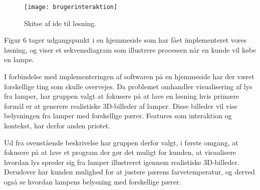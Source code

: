 \begin{figure}[H]
   \centering
   \texttt{[image: brugerinteraktion]}
   \caption{Skitse af ide til løsning.}
\end{figure}

Figur 6 tager udgangspunkt i en hjemmeside som har fået implementeret vores løsning, og viser et sekvensdiagram som illustrere processen når en kunde vil købe en lampe.  

I forbindelse med implementeringen af softwaren på en hjemmeside har der været forskellige ting som skulle overvejes. Da problemet omhandler visualisering af lys fra lamper, har gruppen valgt at fokusere på at lave en løsning hvis primære formål er at generere realistiske 3D-billeder af lamper. Disse billeder vil vise belysningen fra lamper med forskellige pærer. Features som interaktion og kontekst, har derfor anden priotet. 

Ud fra ovenstående beskrivelse har gruppen derfor valgt, i første omgang, at fokusere på at lave et program der gør det muligt for kunden, at visualisere hvordan lys spreder sig fra lamper illustreret igennem realistiske 3D-billeder. Derudover har kunden mulighed for at justere pærens farvetemperatur, og derved også se hvordan lampens belysning med forskellige pærer.  


